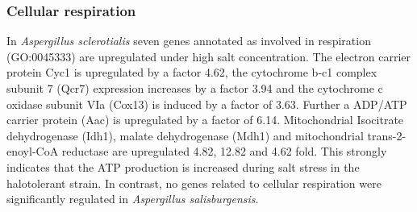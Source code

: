 \documentclass[jof,article,submit,moreauthors,pdftex,10pt,a4paper]{Definitions/mdpi}
\newcommand{\phiSp}{\textit{Aspergillus salisburgensis}}
\newcommand{\phiScl}{\textit{Aspergillus sclerotialis}}
\begin{document}
\subsubsection{Cellular respiration}
In \phiScl{} seven genes annotated as involved in respiration (GO:0045333) are upregulated under high salt concentration. The electron carrier protein Cyc1 is upregulated by a factor 4.62, the cytochrome b-c1 complex subunit 7 (Qcr7) expression increases by a factor 3.94 and the cytochrome c oxidase subunit VIa (Cox13) is induced by a factor of 3.63. Further a ADP/ATP carrier protein (Aac) is upregulated by a factor of 6.14. Mitochondrial Isocitrate dehydrogenase (Idh1), malate dehydrogenase (Mdh1) and mitochondrial trans-2-enoyl-CoA reductase are upregulated 4.82, 12.82 and 4.62 fold. This strongly indicates that the ATP production is increased during salt stress in the halotolerant strain. In contrast, no genes related to cellular respiration were significantly regulated in \phiSp{}.
\end{document}
